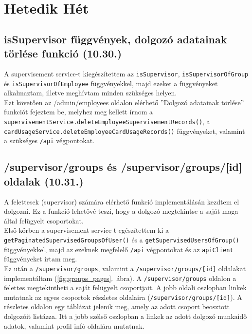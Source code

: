 \documentclass[a4paper]{article}
\newcommand{\inltxt}[1]{\texttt{#1}}
\begin{document}
\section{Hetedik Hét}

\subsection{isSupervisor függvények, dolgozó adatainak törlése funkció (10.30.)}

A supervisement service-t kiegészítettem az \inltxt{isSupervisor}, \inltxt{isSupervisorOfGroup} és
\inltxt{isSupervisorOfEmployee} függvényekkel, majd ezeket a függvényeket alkalmaztam, illetve
meghívtam minden szükséges helyen. \\

Ezt követően az /admin/employees oldalon elérhető ''Dolgozó adatainak törlése'' funkciót fejeztem
be, melyhez meg kellett írnom a
\inltxt{supervisementService.deleteEmployeeSupervisementRecords()}, a
\inltxt{cardUsageService.deleteEmployeeCardUsageRecords()} függvényeket, valamint a
szükséges \inltxt{/api} végpontokat.


\subsection{/supervisor/groups és /supervisor/groups/[id] oldalak (10.31.)}

A felettesek (supervisor) számára elérhető funkció implementálásán kezdtem el dolgozni. Ez a funkció
lehetővé teszi, hogy a dolgozó megtekintse a saját maga által felügyelt csoportokat. \\

Első körben a supervisement service-t egészítettem ki a
\inltxt{getPaginatedSupervisedGroupsOfUser()} és a \inltxt{getSupervisedUsersOfGroup()}
függvényekkel, majd az ezeknek megfelelő \inltxt{/api} végpontokat és az \inltxt{apiClient} függvényeket írtam
meg.\\

Ez után a \inltxt{/supervisor/groups}, valamint a \inltxt{/supervisor/groups/[id]} oldalakat
implementáltam (\ref{fig:groups_pages}.~ábra). A \inltxt{/supervisor/groups} oldalon a felettes megtekintheti a saját felügyelt
csoportjait. A jobb oldali oszlopban linkek mutatnak az egyes csoportok részletes oldalaira
(\inltxt{/supervisor/groups/[id]}). A részletes oldalon egy táblázat jelenik meg, amely az adott csoport
beosztott dolgozóit listázza. Itt a jobb szélső oszlopban a linkek az adott dolgozó munkaidő adatok,
valamint profil infó oldalára mutatnak.
\end{document}
